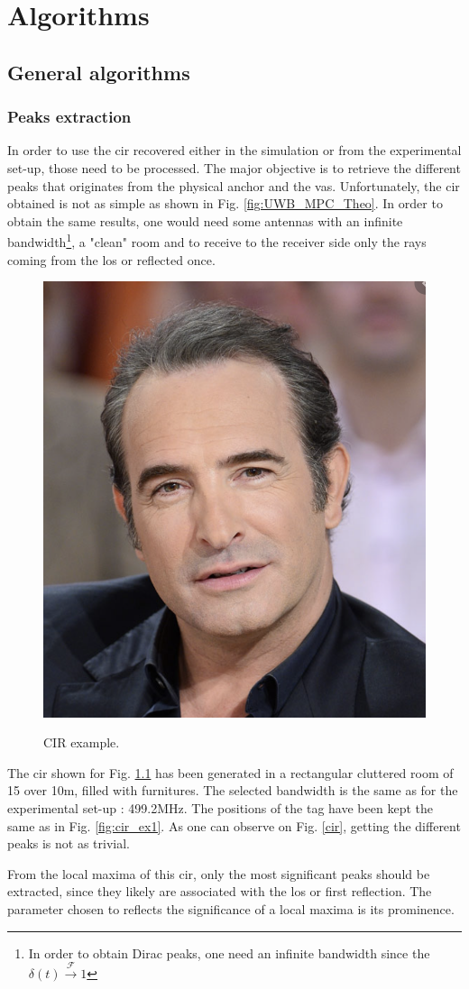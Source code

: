 \chapter{Algorithms}

\section{General algorithms}

\subsection{Peaks extraction}

In order to use the \gls{cir} recovered either in the simulation or from the experimental set-up, those need to be processed. The major objective is to retrieve the different peaks that originates from the physical anchor and the \gls{vas}. Unfortunately, the \gls{cir} obtained is not as simple as shown in Fig. \ref{fig:UWB_MPC_Theo}. In order to obtain the same results, one would need some antennas with an infinite bandwidth\footnote{In order to obtain Dirac peaks, one need an infinite bandwidth since the $\delta(t) \xrightarrow{\mathscr{F}} 1 $}, a "clean" room and to receive to the receiver side only the rays coming from the \gls{los} or reflected once.
\vspace{2mm}

\begin{figure}[H]
\centering
\includegraphics[width=.2\linewidth]{Images/Temporary_pic.png}
\label{fig:cir_example}
\caption{CIR example.}
\end{figure}

The \gls{cir} shown for Fig. \ref{fig:cir_example} has been generated in a rectangular cluttered room of 15 over 10m, filled with furnitures. The selected bandwidth is the same as for the experimental set-up : 499.2MHz. The positions of the tag have been kept the same as in Fig. \ref{fig:cir_ex1}. As one can observe on Fig. \ref{cir}, getting the different peaks is not as trivial.
\vspace{2mm}

From the local maxima  of this \gls{cir}, only the most significant peaks should be extracted, since they likely are associated with the \gls{los} or first reflection. The parameter chosen to reflects the significance of a local maxima is its prominence.
\vspace{2mm}

